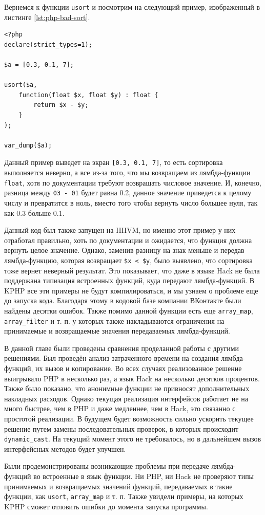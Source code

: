 Вернемся к функции \verb|usort| и посмотрим на следующий пример, изображенный в листинге \ref{lst:php-bad-sort}.
\begin{lstlisting}[caption={Пример типизации в PHP7}, label={lst:php-bad-sort}]
<?php
declare(strict_types=1);

$a = [0.3, 0.1, 7];

usort($a,
    function(float $x, float $y) : float {
        return $x - $y;
    }
);

var_dump($a);
\end{lstlisting}

Данный пример выведет на экран \verb|[0.3, 0.1, 7]|, то есть сортировка выполняется неверно, а все из-за того, что мы возвращаем из лямбда-функции \verb|float|, хотя по документации требуют возвращать числовое значение.
И, конечно, разница между \verb|03 - 01| будет равна 0.2, данное значение приведется к целому числу и превратится в ноль, вместо того чтобы вернуть число большее нуля, так как 0.3 больше 0.1.

Данный код был также запущен на HHVM, но именно этот пример у них отработал правильно, хоть по документации и ожидается, что функция должна вернуть целое значение.
Однако, заменив разницу на знак меньше и передав лямбда-функцию, которая возвращает \verb|$x < $y|, было выявлено, что сортировка тоже вернет неверный результат.
Это показывает, что даже в языке Hack не была поддержана типизация встроенных функций, куда передают лямбда-функций.
В KPHP все эти примеры не будут компилироваться, и мы узнаем о проблеме еще до запуска кода.
Благодаря этому в кодовой базе компании ВКонтакте были найдены десятки ошибок.
Также помимо данной функции есть еще \verb|array_map|, \verb|array_filter| и т. п. у которых также накладываются ограничения на принимаемые и возвращаемые значения передаваемых лямбда-функций.

\chapterconclusion
В данной главе были проведены сравнения проделанной работы с другими решениями.
Был проведён анализ затраченного времени на создания лямбда-функций, их вызов и копирование.
Во всех случаях реализованное решение выигрывало PHP в несколько раз, а язык Hack на несколько десятков процентов.
Также было показано, что анонимные функции не привносят дополнительных накладных расходов.
Однако текущая реализация интерфейсов работает не на много быстрее, чем в PHP и даже медленнее, чем в Hack, это связанно с простотой реализации.
В будущем будет возможность сильно ускорить текущее решение путем замены последовательных проверок, в которых происходит \verb|dynamic_cast|. На текущий момент этого не требовалось, но в дальнейшем вызов интерфейсных методов будет улучшен.

Были продемонстрированы возникающие проблемы при передаче лямбда-функций во встроенные в язык функции.
Ни PHP, ни Hack не проверяют типы принимаемых и возвращаемых значений функций, передаваемых в такие функции, как \verb|usort|, \verb|array_map| и т. п.
Также увидели примеры, на которых KPHP сможет отловить ошибки до момента запуска программы.
